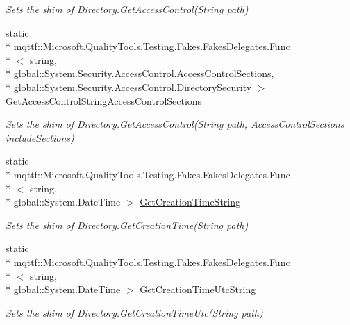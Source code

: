 \begin{DoxyCompactItemize}
\begin{DoxyCompactList}\small\item\em Sets the shim of Directory.\-Get\-Access\-Control(\-String path)\end{DoxyCompactList}\item 
static \\*
mqttf\-::\-Microsoft.\-Quality\-Tools.\-Testing.\-Fakes.\-Fakes\-Delegates.\-Func\\*
$<$ string, \\*
global\-::\-System.\-Security.\-Access\-Control.\-Access\-Control\-Sections, \\*
global\-::\-System.\-Security.\-Access\-Control.\-Directory\-Security $>$ \hyperlink{class_system_1_1_i_o_1_1_fakes_1_1_shim_directory_acf5e068d497c0d1a409bba403c7c143b}{Get\-Access\-Control\-String\-Access\-Control\-Sections}
\begin{DoxyCompactList}\small\item\em Sets the shim of Directory.\-Get\-Access\-Control(\-String path, Access\-Control\-Sections include\-Sections)\end{DoxyCompactList}\item 
static \\*
mqttf\-::\-Microsoft.\-Quality\-Tools.\-Testing.\-Fakes.\-Fakes\-Delegates.\-Func\\*
$<$ string, \\*
global\-::\-System.\-Date\-Time $>$ \hyperlink{class_system_1_1_i_o_1_1_fakes_1_1_shim_directory_a0b55deab30bd15f5c48837772a19d12c}{Get\-Creation\-Time\-String}
\begin{DoxyCompactList}\small\item\em Sets the shim of Directory.\-Get\-Creation\-Time(\-String path)\end{DoxyCompactList}\item 
static \\*
mqttf\-::\-Microsoft.\-Quality\-Tools.\-Testing.\-Fakes.\-Fakes\-Delegates.\-Func\\*
$<$ string, \\*
global\-::\-System.\-Date\-Time $>$ \hyperlink{class_system_1_1_i_o_1_1_fakes_1_1_shim_directory_a8f03ae60493732d5217e12d1904c275c}{Get\-Creation\-Time\-Utc\-String}
\begin{DoxyCompactList}\small\item\em Sets the shim of Directory.\-Get\-Creation\-Time\-Utc(\-String path)\end{DoxyCompactList}\item 

\end{DoxyCompactItemize}
